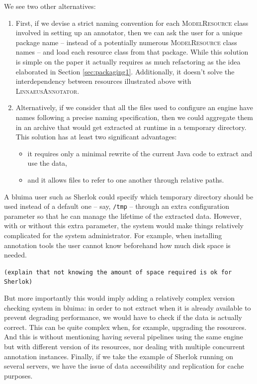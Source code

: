 \documentclass{article}
\newcommand{\ID}[1]{\mbox{\textsc{#1}}}
\newcommand{\PATH}[1]{\mbox{\texttt{#1}}}
\newcommand{\TODO}[1]{\texttt{\textcolor{YellowOrange}{(#1)}}} %
\begin{document}
We see two other alternatives:

\begin{enumerate}

\item First, if we devise a strict naming convention for each \ID{ModelResource} class involved in setting up an annotator, then we can ask the user for a unique package name -- instead of a potentially numerous \ID{ModelResource} class names -- and load each resource class from that package. While this solution is simple on the paper it actually requires as much refactoring as the idea elaborated in Section \ref{sec:packaging1}. Additionally, it doesn't solve the interdependency between resources illustrated above with \ID{LinnaeusAnnotator}.

\item Alternatively, if we consider that all the files used to configure an engine have names following a precise naming specification, then we could aggregate them in an archive that would get extracted at runtime in a temporary directory. This solution has at least two significant advantages:

\begin{itemize}

\item it requires only a minimal rewrite of the current Java code to extract and use the data,

\item and it allows files to refer to one another through relative paths.

\end{itemize}

\end{enumerate}

A bluima user such as Sherlok could specify which temporary directory should be used instead of a default one -- say, \PATH{/tmp} -- through an extra configuration parameter so that he can manage the lifetime of the extracted data. However, with or without this extra parameter, the system would make things relatively complicated for the system administrator. For example, when installing annotation tools the user cannot know beforehand how much disk space is needed.

\TODO{explain that not knowing the amount of space required is ok for Sherlok}

But more importantly this would imply adding a relatively complex version checking system in bluima: in order to not extract when it is already available to prevent degrading performance, we would have to check if the data is actually correct. This can be quite complex when, for example, upgrading the resources. And this is without mentioning having several pipelines using the same engine but with different version of its resources, nor dealing with multiple concurrent annotation instances. Finally, if we take the example of Sherlok running on several servers, we have the issue of data accessibility and replication for cache purposes.
\end{document}
